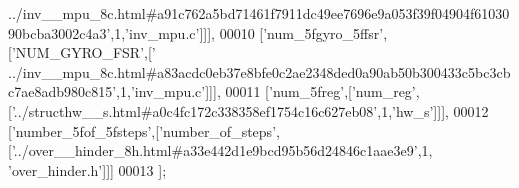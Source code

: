 \begin{DoxyCode}
{      ../inv\_\_mpu\_8c.html#a91c762a5bd71461f7911dc49ee7696e9a053f39f04904f6103090bcba3002c4a3'},1,\textcolor{stringliteral}{'inv\_mpu.c'}]]],
00010   [\textcolor{stringliteral}{'num\_5fgyro\_5ffsr'},[\textcolor{stringliteral}{'NUM\_GYRO\_FSR'},[\textcolor{stringliteral}{'
      ../inv\_\_mpu\_8c.html#a83acdc0eb37e8bfe0c2ae2348ded0a90ab50b300433c5bc3cbc7ae8adb980c815'},1,\textcolor{stringliteral}{'inv\_mpu.c'}]]],
00011   [\textcolor{stringliteral}{'num\_5freg'},[\textcolor{stringliteral}{'num\_reg'},[\textcolor{stringliteral}{'../structhw\_\_s.html#a0c4fc172c338358ef1754c16c627eb08'},1,\textcolor{stringliteral}{'hw\_s'}]]],
00012   [\textcolor{stringliteral}{'number\_5fof\_5fsteps'},[\textcolor{stringliteral}{'number\_of\_steps'},[\textcolor{stringliteral}{'../over\_\_hinder\_8h.html#a33e442d1e9bcd95b56d24846c1aae3e9'},1,\textcolor{stringliteral}{
      'over\_hinder.h'}]]]
00013 ];
\end{DoxyCode}

